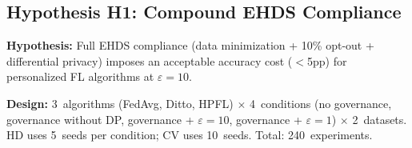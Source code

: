 \documentclass[conference]{IEEEtran}
\begin{document}
\subsection{Hypothesis H1: Compound EHDS Compliance}
\label{sec:h1_compliance}

\textbf{Hypothesis:} Full EHDS compliance (data minimization + 10\% opt-out + differential privacy) imposes an acceptable accuracy cost ($<$5pp) for personalized FL algorithms at $\varepsilon{=}10$.

\textbf{Design:} 3~algorithms (FedAvg, Ditto, HPFL) $\times$ 4~conditions (no governance, governance without DP, governance + $\varepsilon{=}10$, governance + $\varepsilon{=}1$) $\times$ 2~datasets. HD uses 5~seeds per condition; CV uses 10~seeds. Total: 240~experiments.

\begin{table}[htbp]
\centering
\caption{H1: Compound EHDS Compliance Stress Test. ``$\Delta$'' shows accuracy change from no\_governance baseline. Features retained after Article~44 minimization shown as fraction of total. HD: 5 seeds; CV: 10 seeds. Statistically significant differences ($p{<}0.05$, Wilcoxon) marked with $^*$.}
\label{tab:h1_compliance}
\end{table}
\end{document}
